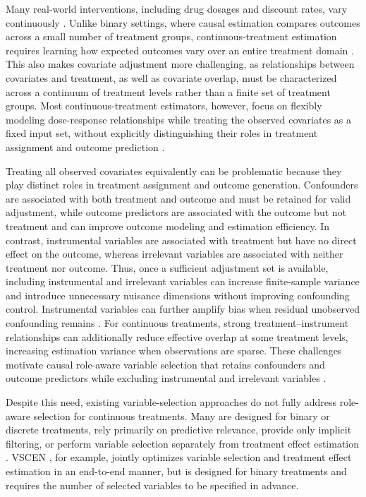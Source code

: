 \documentclass[twoside]{article}
\theoremstyle{plain}
\theoremstyle{definition}
\theoremstyle{remark}
\newtheorem{proof sketch}[theorem]{Proof Sketch}
\begin{document}
{Many real-world interventions, including drug dosages and discount rates, vary continuously \citep{bica2020estimating, kazemi2024adversarially, nagalapatti2024continuous}.
Unlike binary settings, where causal estimation compares outcomes across a small number of treatment groups, continuous-treatment estimation requires learning how expected outcomes vary over an entire treatment domain  \citep{hirano2004propensity,imai2004causal}. 
This also makes covariate adjustment more challenging, as relationships between covariates and treatment, as well as covariate overlap, must be characterized across a continuum of treatment levels rather than a finite set of treatment groups.
Most continuous-treatment estimators, however, focus on flexibly modeling dose-response relationships while treating the observed covariates as a fixed input set, without explicitly distinguishing their roles in treatment assignment and outcome prediction \citep{nie2021vcnet, bica2020estimating}.



Treating all observed covariates equivalently can be problematic because they play distinct roles in treatment assignment and outcome generation.
Confounders are associated with both treatment and outcome and must be retained for valid adjustment, while outcome predictors are associated with the outcome but not treatment and can improve outcome modeling and estimation efficiency. 
In contrast, instrumental variables are associated with treatment but have no direct effect on the outcome, whereas irrelevant variables are associated with neither treatment nor outcome. 
Thus, once a sufficient adjustment set is available, including instrumental and irrelevant variables can increase finite-sample variance and introduce unnecessary nuisance dimensions without improving confounding control.
Instrumental variables can further amplify bias when residual unobserved confounding remains \citep{pearl2011invited,ding2017instrumental}. 
For continuous treatments, strong treatment--instrument relationships can additionally reduce effective overlap at some treatment levels, increasing estimation variance when observations are sparse. 
These challenges motivate causal role-aware variable selection that retains confounders and outcome predictors while excluding instrumental and irrelevant variables \citep{pearl2014confounding,ma2025simultaneous}.


Despite this need, existing variable-selection approaches do not fully address role-aware selection for continuous treatments. Many are designed for binary or discrete treatments, rely primarily on predictive relevance, provide only implicit filtering, or perform variable selection separately from treatment effect estimation \citep{greenewald2021high,vanderschueren2025autocate}.
VSCEN \citep{ma2025simultaneous}, for example, jointly optimizes variable selection and treatment effect estimation in an end-to-end manner, but is designed for binary treatments and requires the number of selected variables to be specified in advance.



}
\end{document}
